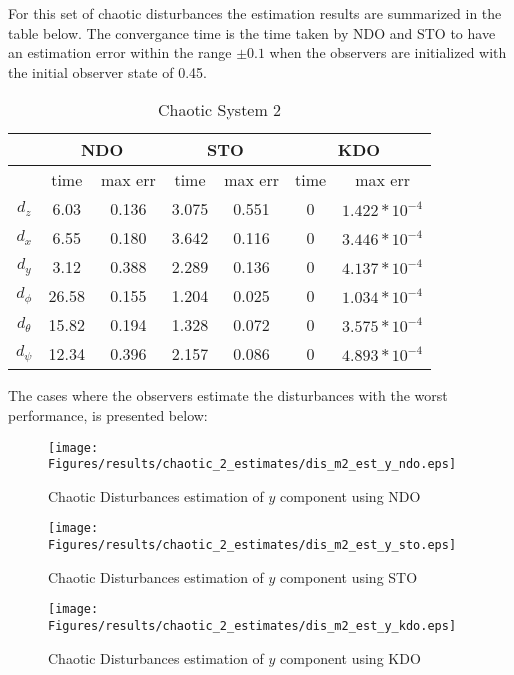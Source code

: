 \documentclass{article}
\begin{document}
For this set of chaotic disturbances the estimation results are summarized in the table below. The convergance time is the time taken by NDO and STO to have an estimation error within the range $\pm0.1$ when the observers are initialized with the initial observer state of 0.45. 

\begin{table}[!htbp]
\centering
\caption{Chaotic System 2}
\begin{tabular}{*7c}
\toprule
{}  &  \multicolumn{2}{c}{NDO} & \multicolumn{2}{c}{STO} & \multicolumn{2}{c}{KDO}\\
\midrule
{}        &   time  & max err  & time  & max err& time  & max err\\
$d_z$     &  6.03 & 0.136   & 3.075  & 0.551 & 0     & $1.422*10^{-4}$\\
$d_x$     &  6.55 & 0.180   & 3.642  & 0.116 & 0     & $3.446*10^{-4}$\\
$d_y$     &  3.12 & 0.388   & 2.289  & 0.136 & 0     & $4.137*10^{-4}$\\
$d_\phi$  &  26.58& 0.155   & 1.204  & 0.025 & 0     & $1.034*10^{-4}$\\
$d_\theta$&  15.82& 0.194   & 1.328  & 0.072 & 0     & $3.575*10^{-4}$\\
$d_\psi$  &  12.34& 0.396   & 2.157  & 0.086 & 0     & $4.893*10^{-4}$\\

\bottomrule
\end{tabular}
\end{table}

The cases where the observers estimate the disturbances with the worst performance, is presented below:

\begin{figure}[H]
\centering
\texttt{[image: Figures/results/chaotic\_2\_estimates/dis\_m2\_est\_y\_ndo.eps]}
\caption{Chaotic Disturbances estimation of $y$ component using NDO}
\label{dis_m2_est_y_ndo}
\end{figure}

\begin{figure}[H]
\centering
\texttt{[image: Figures/results/chaotic\_2\_estimates/dis\_m2\_est\_y\_sto.eps]}
\caption{Chaotic Disturbances estimation of $y$ component using STO}
\label{dis_m2_est_y_sto}
\end{figure}

\begin{figure}[H]
\centering
\texttt{[image: Figures/results/chaotic\_2\_estimates/dis\_m2\_est\_y\_kdo.eps]}
\caption{Chaotic Disturbances estimation of $y$ component using KDO}
\label{dis_m2_est_y_kdo}
\end{figure}
\end{document}
